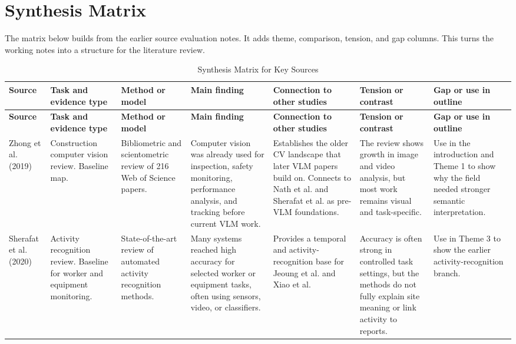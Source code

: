 \documentclass[10pt, letterpaper]{article}
\begin{document}
\section{Synthesis Matrix}

The matrix below builds from the earlier source evaluation notes. It adds theme, comparison, tension, and gap columns. This turns the working notes into a structure for the literature review.

\begin{landscape}
\small
{}
\begin{longtable}{L{3.0cm} L{2.2cm} L{2.5cm} L{2.9cm} L{3.5cm} L{3.6cm} L{3.2cm}}
\caption{Synthesis Matrix for Key Sources}\\
\toprule
{}
\textbf{Source} & \textbf{Task and evidence type} & \textbf{Method or model} & \textbf{Main finding} & \textbf{Connection to other studies} & \textbf{Tension or contrast} & \textbf{Gap or use in outline} \\
\midrule
\endfirsthead
\toprule
{}
\textbf{Source} & \textbf{Task and evidence type} & \textbf{Method or model} & \textbf{Main finding} & \textbf{Connection to other studies} & \textbf{Tension or contrast} & \textbf{Gap or use in outline} \\
\midrule
\endhead
\bottomrule
\endfoot

Zhong et al. (2019) & Construction computer vision review. Baseline map. & Bibliometric and scientometric review of 216 Web of Science papers. & Computer vision was already used for inspection, safety monitoring, performance analysis, and tracking before current VLM work. & Establishes the older CV landscape that later VLM papers build on. Connects to Nath et al. and Sherafat et al. as pre-VLM foundations. & The review shows growth in image and video analysis, but most work remains visual and task-specific. & Use in the introduction and Theme 1 to show why the field needed stronger semantic interpretation. \\

Sherafat et al. (2020) & Activity recognition review. Baseline for worker and equipment monitoring. & State-of-the-art review of automated activity recognition methods. & Many systems reached high accuracy for selected worker or equipment tasks, often using sensors, video, or classifiers. & Provides a temporal and activity-recognition base for Jeoung et al. and Xiao et al. & Accuracy is often strong in controlled task settings, but the methods do not fully explain site meaning or link activity to reports. & Use in Theme 3 to show the earlier activity-recognition branch. \\


\end{longtable}
\end{landscape}
\end{document}
